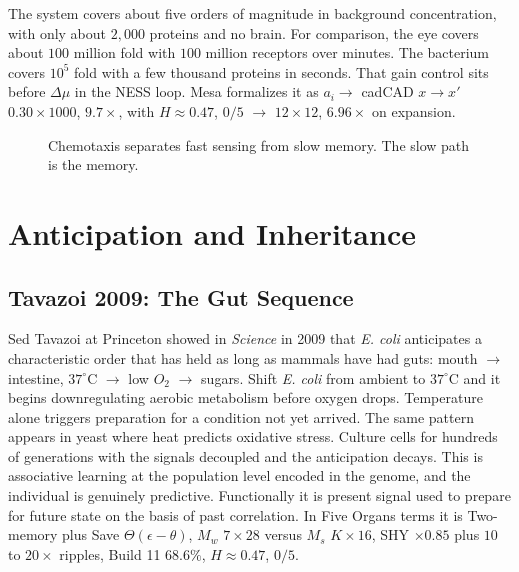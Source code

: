 \documentclass[11pt,a4paper]{article}
\begin{document}
The system covers about five orders of magnitude in background concentration, with only about $2{,}000$ proteins and no brain. For comparison, the eye covers about $100$ million fold with $100$ million receptors over minutes. The bacterium covers $10^5$ fold with a few thousand proteins in seconds. That gain control sits before $\Delta \mu$ in the NESS loop. Mesa formalizes it as $a_i \to$ cadCAD $x \to x'$ $0.30 \times 1000$, $9.7\times$, with $H \approx 0.47$, $0/5$ $\to$ $12 \times 12$, $6.96\times$ on expansion.

\begin{figure}[h]
\centering
{}
\caption{Chemotaxis separates fast sensing from slow memory. The slow path is the memory.}
\label{fig:chemtaxis}
\end{figure}

\section{Anticipation and Inheritance}
\label{sec:anticipation}

\subsection{Tavazoi 2009: The Gut Sequence}

Sed Tavazoi at Princeton showed in \textit{Science} in 2009 that \textit{E. coli} anticipates a characteristic order that has held as long as mammals have had guts: mouth $\to$ intestine, $37^{\circ}$C $\to$ low $O_2$ $\to$ sugars. Shift \textit{E. coli} from ambient to $37^{\circ}$C and it begins downregulating aerobic metabolism before oxygen drops. Temperature alone triggers preparation for a condition not yet arrived. The same pattern appears in yeast where heat predicts oxidative stress. Culture cells for hundreds of generations with the signals decoupled and the anticipation decays. This is associative learning at the population level encoded in the genome, and the individual is genuinely predictive. Functionally it is present signal used to prepare for future state on the basis of past correlation. In Five Organs terms it is Two-memory plus Save $\Theta(\epsilon - \theta)$, $M_w$ $7 \times 28$ versus $M_s$ $K \times 16$, SHY $\times 0.85$ plus $10$ to $20\times$ ripples, Build 11 $68.6\%$, $H \approx 0.47$, $0/5$.
\end{document}
